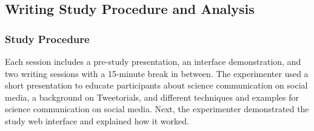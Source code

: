 

\subsection{Writing Study Procedure and Analysis}

\subsubsection{Study Procedure}
Each session includes a pre-study presentation, an interface demonstration, and two writing sessions with a 15-minute break in between. The experimenter used a short presentation to educate participants about science communication on social media, a background on Tweetorials, and different techniques and examples for science communication on social media. Next, the experimenter demonstrated the study web interface and explained how it worked. 

